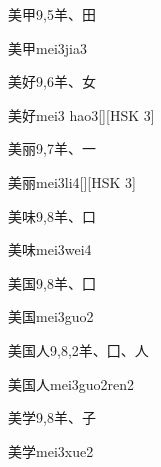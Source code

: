\begin{entry}{美甲}{9,5}{⽺、⽥}
  \begin{phonetics}{美甲}{mei3jia3}
  \end{phonetics}
\end{entry}

\begin{entry}{美好}{9,6}{⽺、⼥}
  \begin{phonetics}{美好}{mei3 hao3}[][HSK 3]
  \end{phonetics}
\end{entry}

\begin{entry}{美丽}{9,7}{⽺、⼀}
  \begin{phonetics}{美丽}{mei3li4}[][HSK 3]
  \end{phonetics}
\end{entry}

\begin{entry}{美味}{9,8}{⽺、⼝}
  \begin{phonetics}{美味}{mei3wei4}
  \end{phonetics}
\end{entry}

\begin{entry}{美国}{9,8}{⽺、⼞}
  \begin{phonetics}{美国}{mei3guo2}
  \end{phonetics}
\end{entry}

\begin{entry}{美国人}{9,8,2}{⽺、⼞、⼈}
  \begin{phonetics}{美国人}{mei3guo2ren2}
  \end{phonetics}
\end{entry}

\begin{entry}{美学}{9,8}{⽺、⼦}
  \begin{phonetics}{美学}{mei3xue2}
  \end{phonetics}
\end{entry}

